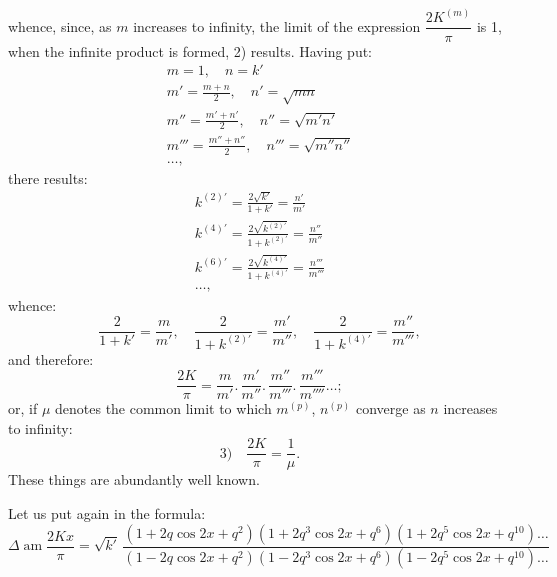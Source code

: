 \documentclass{article}
\begin{document}
whence, since, as $m$ increases to infinity, the limit of the expression $\dfrac{2K^{(m)}}{\pi}$ is 1, when the infinite product is formed, 2) results. Having put:
\[
\begin{gathered}
m=1,\quad n=k'
\\[2ex]
m'=\frac{m+n}{2},\quad n'=\sqrt{mn}
\\[2ex]
m''=\frac{m'+n'}{2},\quad n''=\sqrt{m'n'}
\\[2ex]
m'''=\frac{m''+n''}{2},\quad n'''=\sqrt{m''n''}
\\[2ex]
\ldots,
\end{gathered}
\]
there results:
\[
\begin{gathered}
k^{(2)\prime}=\frac{2\sqrt{k'}}{1+k'}=\frac{n'}{m'}
\\[2ex]
k^{(4)\prime}=\frac{2\sqrt{k^{(2)\prime}}}{1+k^{(2)\prime}}=\frac{n''}{m''}
\\[2ex]
k^{(6)\prime}=\frac{2\sqrt{k^{(4)\prime}}}{1+k^{(4)\prime}}=\frac{n'''}{m'''}
\\[2ex]
\ldots,
\end{gathered}
\]
whence:
\[
\frac{2}{1+k'}=\frac{m}{m'},\quad\frac{2}{1+k^{(2)\prime}}=\frac{m'}{m''},\quad\frac{2}{1+k^{(4)\prime}}=\frac{m''}{m'''},
\]
and therefore:
\[
\frac{2K}{\pi}=\frac{m}{m'}.\,\frac{m'}{m''}.\,\frac{m''}{m'''}.\,\frac{m'''}{m''''}\ldots;
\]
or, if $\mu$ denotes the common limit to which $m^{(p)}$, $n^{(p)}$ converge as $n$ increases to infinity:
\[
\text{3)}\quad\frac{2K}{\pi}=\frac{1}{\mu}.
\]
These things are abundantly well known.

Let us put again in the formula:
\[
\Delta\operatorname{am}\frac{2Kx}{\pi}=\sqrt{k'}\,\frac{(1+2q\cos 2x+q^{2})(1+2q^{3}\cos 2x+q^{6})(1+2q^{5}\cos 2x+q^{10})\ldots}{(1-2q\cos 2x+q^{2})(1-2q^{3}\cos 2x+q^{6})(1-2q^{5}\cos 2x+q^{10})\ldots}
\]
\end{document}

